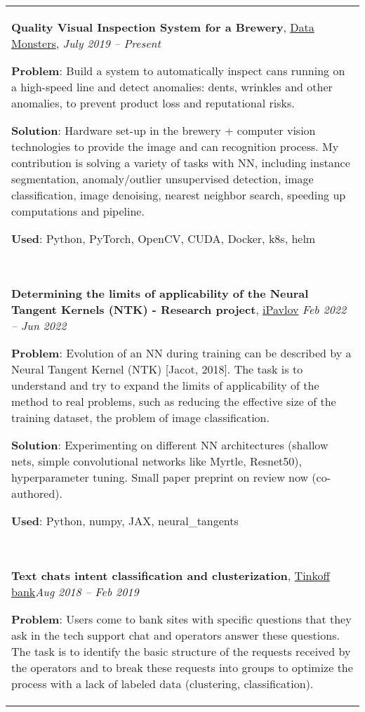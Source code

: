 \documentclass[a4paper,12pt]{memoir} %
\newcommand{\opendialog}{\bluebullet}
\newcommand{\bullitem}[1]{\opendialog #1}
\begin{document}
	\begin{tabular}{p{} }
		\bullitem{\textbf{Quality Visual Inspection System for a Brewery}, \href{https://datamonsters.com/}{Data Monsters}}, \hfill \emph{July 2019 -- Present}
		
		\textbf{Problem}: Build a system to automatically inspect cans running on a high-speed line and detect anomalies: dents, wrinkles and other anomalies, to prevent product loss and reputational risks. 
		
		\textbf{Solution}: Hardware set-up in the brewery + computer vision technologies to provide the image and can recognition process. My contribution is solving a variety of tasks with NN, including instance segmentation, anomaly/outlier unsupervised detection, image classification, image denoising, nearest neighbor search, speeding up computations and pipeline.
		
		\textbf{Used}: Python, PyTorch, OpenCV, CUDA, Docker, k8s, helm

		~

		\SepSep
		\bullitem{\textbf{Determining the limits of applicability of the Neural Tangent Kernels (NTK) - Research project}, \href{https://ipavlov.ai/en}{iPavlov}} \hfill \emph{Feb 2022 -- Jun 2022}
		
		\textbf{Problem}:  Evolution of an NN during training can be described by a Neural Tangent Kernel (NTK) [Jacot, 2018]. The task is to understand and try to expand the limits of applicability of the method to real problems, such as reducing the effective size of the training dataset, the problem of image classification.
		
		\textbf{Solution}: Experimenting on different NN architectures (shallow nets, simple convolutional networks like Myrtle, Resnet50), hyperparameter tuning. Small paper preprint on review now (co-authored).
		
		\textbf{Used}: Python, numpy, JAX, neural\_tangents

		~
		
		\SepSep
		\bullitem{\textbf{Text chats intent classification and clusterization}, \href{https://www.tinkoff.ru/eng/}{Tinkoff bank}}\hfill\emph{Aug 2018 -- Feb 2019}
			
		\textbf{Problem}: Users come to bank sites with specific questions that they ask in the tech support chat and operators answer these questions. The task is to identify the basic structure of the requests received by the operators and to break these requests into groups to optimize the process with a lack of labeled data (clustering, classification).
		

\end{tabular}
\end{document}
